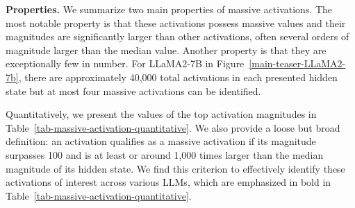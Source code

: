 \documentclass[10pt]{article}
\begin{document}
\textbf{Properties.} We summarize two main properties of massive activations. The most notable property is that these activations possess massive values and their magnitudes are significantly larger than other activations, often several orders of magnitude larger than the median value. Another property is that they are exceptionally few in number. For LLaMA2-7B in Figure~\ref{main-teaser-LLaMA2-7b}, there are approximately 40,000 total activations in each presented hidden state but at most four massive activations can be identified. 

\begin{table}[b!]
\centering
\vspace{-1ex}
\renewcommand{\arraystretch}{1.0}
\vspace{-1ex}
\caption{Five largest, top 1$\%$ and 10$\%$, and the median \textit{activation magnitudes} at a hidden state of three LLMs. The activations that are considered as massive activations are highlighted in bold.
}
\label{tab-massive-activation-quantitative}
\end{table}

Quantitatively, we present the values of the top activation magnitudes in Table~\ref{tab-massive-activation-quantitative}. We also provide a loose but broad definition: an activation qualifies as a massive activation if its magnitude surpasses 100 and is at least or around 1,000 times larger than the median magnitude of its hidden state. We find this criterion to effectively identify these activations of interest across various LLMs, which are emphasized in bold in Table~\ref{tab-massive-activation-quantitative}.
\end{document}
